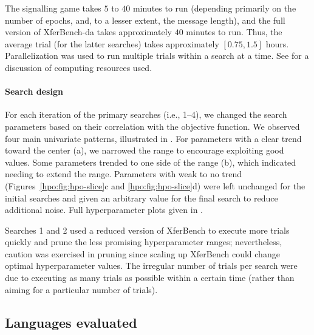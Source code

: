 The signalling game takes $5$ to $40$ minutes to run (depending primarily on the number of epochs, and, to a lesser extent, the message length), and the full version of XferBench-da takes approximately $40$ minutes to run.
Thus, the average trial (for the latter searches) takes approximately $[0.75,1.5]$ hours.
Parallelization was used to run multiple trials within a search at a time.
See  for a discussion of computing resources used.


\paragraph{Search design}
For each iteration of the primary searches (i.e., 1--4), we changed the search parameters based on their correlation with the objective function.
We observed four main univariate patterns\footnotemark{}, illustrated in .
For parameters with a clear trend toward the center (a), we narrowed the range to encourage exploiting good values.
Some parameters trended to one side of the range (b), which indicated needing to extend the range.
Parameters with weak to no trend (Figures~\ref{hpo:fig:hpo-slice}c and \ref{hpo:fig:hpo-slice}d) were left unchanged for the initial searches and given an arbitrary value for the final search to reduce additional noise.
Full hyperparameter plots given in .

Searches 1 and 2 used a reduced version of XferBench to execute more trials quickly and prune the less promising hyperparameter ranges; nevertheless, caution was exercised in pruning since scaling up XferBench could change optimal hyperparameter values.
The irregular number of trials per search were due to executing as many trials as possible within a certain time (rather than aiming for a particular number of trials).


\subsection{Languages evaluated}

